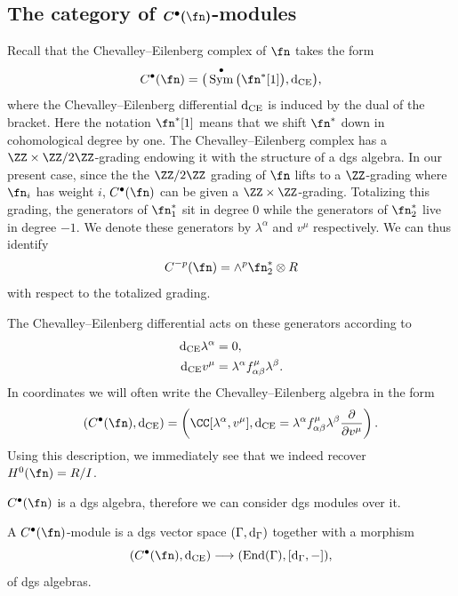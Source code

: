\documentclass[10pt,a4paper]{amsart}
\numberwithin{equation}{section}
\def\d{{\rm d}}
\DeclareMathOperator{\End}{End}
\DeclareMathOperator{\Sym}{Sym}
\begin{document}
\subsection[The category of C\^{}bullet(n)-modules]{The category of $\boldsymbol{C^\bullet(\fn)}$-modules} \label{CE_module_section}
Recall that the Chevalley--Eilenberg complex of $\fn$ takes the form
\begin{equation*}
C^\bullet(\fn) = \big( \Sym^\bullet\big(\fn^*[1]\big) , \d_{\mathrm{CE}} \big),
\end{equation*}
where the Chevalley--Eilenberg differential $\d_{\mathrm{CE}}$ is induced by the dual of the bracket. Here the notation $\fn^*[1]$ means that we shift $\fn^*$ down in cohomological degree by one. The Chevalley--Eilenberg complex has a $\ZZ \times \ZZ/2\ZZ$-grading endowing it with the structure of a dgs algebra. In our present case, since the the $\ZZ/2\ZZ$ grading of $\fn$ lifts to a $\ZZ$-grading where $\fn_i$ has weight $i$, $C^\bullet(\fn)$ can be given a $\ZZ \times \ZZ$-grading. Totalizing this grading, the generators of $\fn_1^*$ sit in degree $0$ while the generators of $\fn_2^*$ live in degree $-1$. We denote these generators by $\lambda^\alpha$ and $v^\mu$ respectively. We can thus identify{\samepage
\begin{equation*}
C^{-p}(\fn) = \wedge^p \fn_2^* \otimes R
\end{equation*}
with respect to the totalized grading.}

The Chevalley--Eilenberg differential acts on these generators according to
\begin{equation*}
\begin{split}
\d_{\mathrm{CE}} \lambda^\alpha &= 0, \\
\d_{\mathrm{CE}} v^\mu &= \lambda^\alpha f^\mu_{\alpha \beta} \lambda^\beta.
\end{split}
\end{equation*}
In coordinates we will often write the Chevalley--Eilenberg algebra in the form
\begin{equation*}
\left( C^\bullet(\fn), \d_{\mathrm{CE}} \right) = \left( \CC[\lambda^\alpha ,v^\mu] , \d_{\mathrm{CE}} = \lambda^\alpha f^\mu_{\alpha \beta} \lambda^\beta \frac{\partial}{\partial v^\mu} \right) .
\end{equation*}
Using this description, we immediately see that we indeed recover $H^0(\fn) = R/I$.

$C^\bullet(\fn)$ is a dgs algebra, therefore we can consider dgs modules over it.
\begin{dfn}
	A $C^\bullet(\fn)$-module is a dgs vector space $(\Gamma, \d_\Gamma)$ together with a morphism
	\begin{equation*}
	(C^\bullet(\fn) , \d_{\mathrm{CE}}) \longrightarrow (\End(\Gamma) , [\d_\Gamma , -]),
	\end{equation*}
	of dgs algebras.
\end{dfn}
\end{document}
